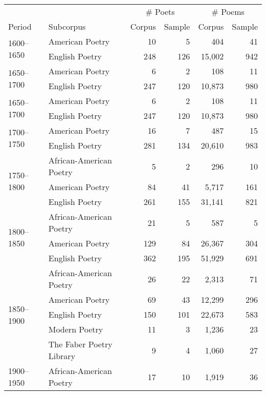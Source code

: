 \documentclass{simple-humanities}         %
\begin{document}
\begin{table}[H]
  \centering
  \small
  \singlespacing
  \begin{tabular}{llrrrr}
    \toprule
    & & \multicolumn{2}{c}{\# Poets} & \multicolumn{2}{c}{\# Poems} \\
    \cmidrule(lr){3-4} \cmidrule(lr){5-6}
    Period & Subcorpus & Corpus & Sample & Corpus & Sample \\
    \midrule
    \multirow[t]{2}{*}{1600--1650} & American Poetry & 10 & 5 & 404 & 41 \\
     & English Poetry & 248 & 126 & 15,002 & 942 \\
    \cline{1-6}
    \multirow[t]{2}{*}{1650--1700} & American Poetry & 6 & 2 & 108 & 11 \\
     & English Poetry & 247 & 120 & 10,873 & 980 \\
    \cline{1-6}
    \multirow[t]{2}{*}{1650--1700} & American Poetry & 6 & 2 & 108 & 11 \\
     & English Poetry & 247 & 120 & 10,873 & 980 \\
    \cline{1-6}
    \multirow[t]{2}{*}{1700--1750} & American Poetry & 16 & 7 & 487 & 15 \\
     & English Poetry & 281 & 134 & 20,610 & 983 \\
    \cline{1-6}
    \multirow[t]{3}{*}{1750--1800} & African-American Poetry & 5 & 2 & 296 & 10 \\
     & American Poetry & 84 & 41 & 5,717 & 161 \\
     & English Poetry & 261 & 155 & 31,141 & 821 \\
    \cline{1-6}
    \multirow[t]{3}{*}{1800--1850} & African-American Poetry & 21 & 5 & 587 & 5 \\
     & American Poetry & 129 & 84 & 26,367 & 304 \\
     & English Poetry & 362 & 195 & 51,929 & 691 \\
    \cline{1-6}
    \multirow[t]{5}{*}{1850--1900} & African-American Poetry & 26 & 22 & 2,313 & 71 \\
     & American Poetry & 69 & 43 & 12,299 & 296 \\
     & English Poetry & 150 & 101 & 22,673 & 583 \\
     & Modern Poetry & 11 & 3 & 1,236 & 23 \\
     & The Faber Poetry Library & 9 & 4 & 1,060 & 27 \\
    \cline{1-6}
    \multirow[t]{5}{*}{1900--1950} & African-American Poetry & 17 & 10 & 1,919 & 36 \\

\end{tabular}
\end{table}
\end{document}
